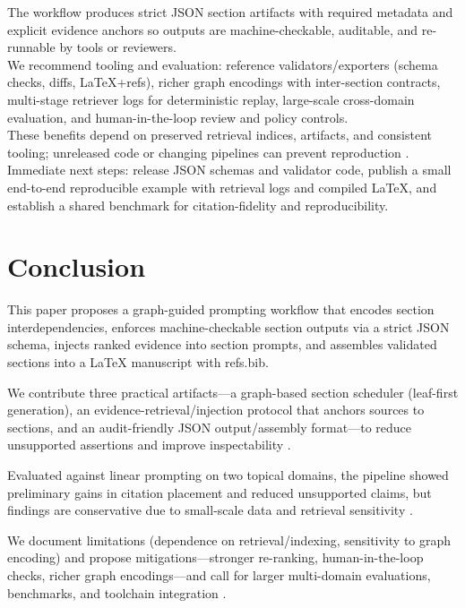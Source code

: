 \documentclass{article}%
\begin{document}
%
The workflow produces strict JSON section artifacts with required metadata and explicit evidence anchors so outputs are machine-checkable, auditable, and re-runnable by tools or reviewers.\\
We recommend tooling and evaluation: reference validators/exporters (schema checks, diffs, LaTeX+refs), richer graph encodings with inter-section contracts, multi-stage retriever logs for deterministic replay, large-scale cross-domain evaluation, and human-in-the-loop review and policy controls.\\
These benefits depend on preserved retrieval indices, artifacts, and consistent tooling; unreleased code or changing pipelines can prevent reproduction \cite{2401.03648v2,2012.11405v2,2301.05174v2}.\\
Immediate next steps: release JSON schemas and validator code, publish a small end-to-end reproducible example with retrieval logs and compiled LaTeX, and establish a shared benchmark for citation-fidelity and reproducibility.%

%
\section{Conclusion}%


%
This paper proposes a graph-guided prompting workflow that encodes section interdependencies, enforces machine-checkable section outputs via a strict JSON schema, injects ranked evidence into section prompts, and assembles validated sections into a LaTeX manuscript with refs.bib.

We contribute three practical artifacts---a graph-based section scheduler (leaf-first generation), an evidence-retrieval/injection protocol that anchors sources to sections, and an audit-friendly JSON output/assembly format---to reduce unsupported assertions and improve inspectability \cite{2201.04672v1}.

Evaluated against linear prompting on two topical domains, the pipeline showed preliminary gains in citation placement and reduced unsupported claims, but findings are conservative due to small-scale data and retrieval sensitivity \cite{2506.20844v2}.

We document limitations (dependence on retrieval/indexing, sensitivity to graph encoding) and propose mitigations---stronger re-ranking, human-in-the-loop checks, richer graph encodings---and call for larger multi-domain evaluations, benchmarks, and toolchain integration \cite{2506.20844v2,2012.11740v1}.%

%
%
%
\end{document}
